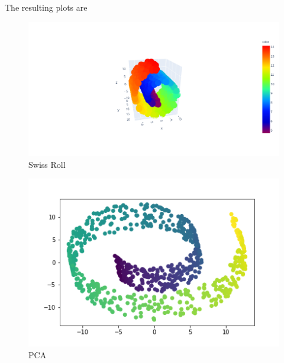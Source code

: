 The resulting plots are
\begin{figure}[h]
    \includegraphics[width=1\textwidth]{swiss_roll.png}
    \caption{Swiss Roll}
 \end{figure}
\newpage
\begin{figure}[h]
    \includegraphics[width=1\textwidth]{pca.png}
    \caption{PCA}
\end{figure}

